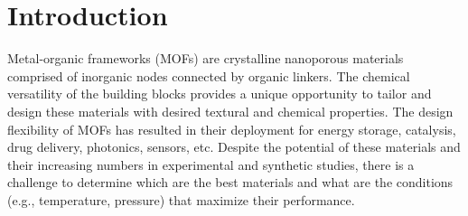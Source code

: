 \documentclass[twoside,twocolumn,9pt]{article}
\begin{document}

\renewcommand*\rmdefault{bch}\normalfont\upshape
\rmfamily
\section*{}
\vspace{-1cm}








\section{Introduction}

Metal-organic frameworks (MOFs) are crystalline nanoporous materials comprised of inorganic nodes connected by organic linkers.\cite{Kondo1997} The chemical versatility of the building blocks provides a unique opportunity to tailor and design these materials with desired textural and chemical properties. The design flexibility of MOFs has resulted in their deployment for energy storage, catalysis, drug delivery, photonics, sensors, etc.\cite{Langmi2014,CO2,HU_CO2,mof_catalysis,separation,mof_sensors,mof_drug,mof_drugs,photon} Despite the potential of these materials and their increasing numbers in experimental and synthetic studies, there is a challenge to determine which are the best materials and what are the conditions (e.g., temperature, pressure) that maximize their performance.
\end{document}

